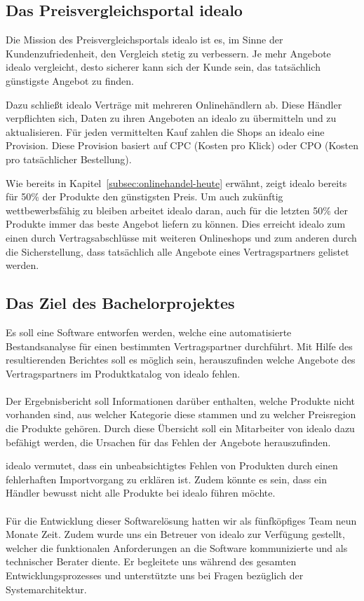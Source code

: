\subsection{Das Preisvergleichsportal idealo}
\label{subsec:idealo}

Die Mission des Preisvergleichsportals idealo ist es, im Sinne der Kundenzufriedenheit, den Vergleich stetig zu
verbessern.
Je mehr Angebote idealo vergleicht, desto sicherer kann sich der Kunde sein, das tatsächlich günstigste Angebot zu
finden.

Dazu schließt idealo Verträge mit mehreren Onlinehändlern ab.
Diese Händler verpflichten sich, Daten zu ihren Angeboten an idealo zu übermitteln und zu aktualisieren.
Für jeden vermittelten Kauf zahlen die Shops an idealo eine Provision.
Diese Provision basiert auf CPC (Kosten pro Klick) oder CPO (Kosten pro tatsächlicher Bestellung).

Wie bereits in Kapitel~\ref{subsec:onlinehandel-heute} erwähnt, zeigt idealo bereits für 50\% der Produkte den
günstigsten Preis.
Um auch zukünftig wettbewerbsfähig zu bleiben arbeitet idealo daran, auch für die letzten 50\% der Produkte
immer das beste Angebot liefern zu können.
Dies erreicht idealo zum einen durch Vertragsabschlüsse mit weiteren Onlineshops und zum anderen durch die
Sicherstellung, dass tatsächlich alle Angebote eines Vertragspartners gelistet werden.

\subsection{Das Ziel des Bachelorprojektes}
\label{subsec:projektziel}

Es soll eine Software entworfen werden, welche eine automatisierte Bestandsanalyse für einen bestimmten
Vertragspartner durchführt.
Mit Hilfe des resultierenden Berichtes soll es möglich sein, herauszufinden welche Angebote des Vertragspartners im
Produktkatalog von idealo fehlen.
\\
~\\
Der Ergebnisbericht soll Informationen darüber enthalten, welche Produkte nicht vorhanden sind, aus welcher Kategorie
diese stammen und zu welcher Preisregion die Produkte gehören.
Durch diese Übersicht soll ein Mitarbeiter von idealo dazu befähigt werden, die Ursachen für das Fehlen der Angebote
herauszufinden.

idealo vermutet, dass ein unbeabsichtigtes Fehlen von Produkten durch einen fehlerhaften Importvorgang zu erklären ist.
Zudem könnte es sein, dass ein Händler bewusst nicht alle Produkte bei idealo führen möchte.
\\
~\\
Für die Entwicklung dieser Softwarelösung hatten wir als fünfköpfiges Team neun Monate Zeit.
Zudem wurde uns ein Betreuer von idealo zur Verfügung gestellt, welcher die funktionalen Anforderungen an die
Software kommunizierte und als technischer Berater diente.
Er begleitete uns während des gesamten Entwicklungsprozesses und unterstützte uns bei Fragen bezüglich der
Systemarchitektur.

